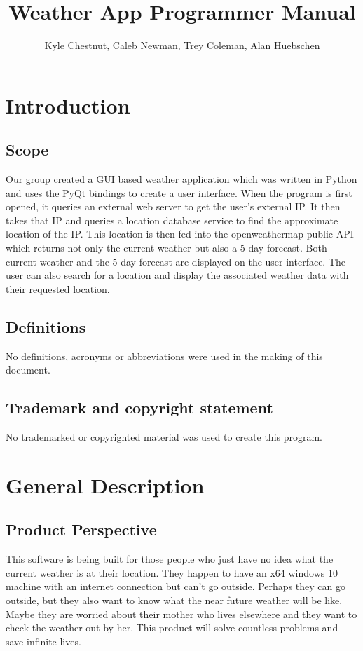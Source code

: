 \documentclass[12pt, titlepage]{article}
\title{Weather App Programmer Manual}
\author{Kyle Chestnut, Caleb Newman, Trey Coleman, Alan Huebschen}
\begin{document}
\maketitle

\section{Introduction}

\subsection{Scope}

Our group created a GUI based weather application which was written in Python and uses the PyQt bindings to create a user interface. When the program is first opened, it queries an external web server to get the user’s external IP. It then takes that IP and queries a location database service to find the approximate location of the IP. This location is then fed into the openweathermap public API which returns not only the current weather but also a 5 day forecast. Both current weather and the 5 day forecast are displayed on the user interface. The user can also search for a location and display the associated weather data with their requested location.

\subsection{Definitions}

No definitions, acronyms or abbreviations were used in the making of this document.

\subsection{Trademark and copyright statement}

No trademarked or copyrighted material was used to create this program.

\section{General Description}
\subsection{Product Perspective}

This software is being built for those people who just have no idea what the current weather is at their location. They happen to have an x64 windows 10 machine with an internet connection but can’t go outside. Perhaps they can go outside, but they also want to know what the near future weather will be like. Maybe they are worried about their mother who lives elsewhere and they want to check the weather out by her. This product will solve countless problems and save infinite lives.
\end{document}
